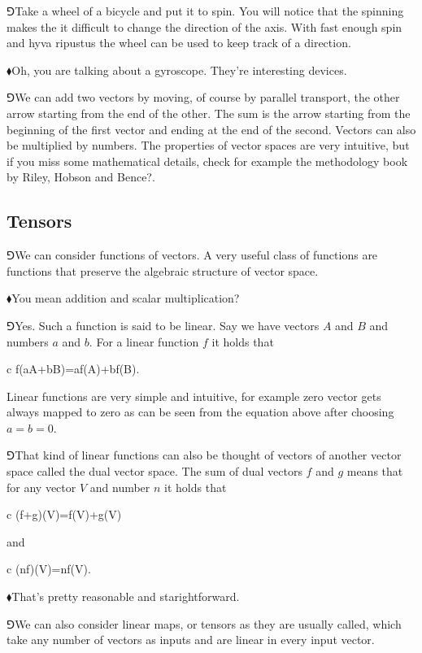 \documentclass[10pt,oneside%
]{memoir}
\newenvironment{eqna}{\begin{IEEEeqnarray*}{c}}{\end{IEEEeqnarray*}\ignorespacesafterend}
\newcommand{\hea}{\(\blacklozenge\)\;}
\newcommand{\heb}{\(\Game\)\;}
\begin{document}
\heb Take a wheel of a bicycle and put it to spin. You will notice that the spinning makes the it difficult to change the direction of the axis. With fast enough spin and hyva ripustus the wheel can be used to keep track of a direction.

\hea Oh, you are talking about a gyroscope. They're interesting devices.

\heb We can add two vectors by moving, of course by parallel transport, the other arrow starting from the end of the other. The sum is the arrow starting from the beginning of the first vector and ending at the end of the second. Vectors can also be multiplied by numbers. The properties of vector spaces are very intuitive, but if you miss some mathematical details, check for example the methodology book by Riley, Hobson and Bence?.
\subsection{Tensors}
\heb We can consider functions of vectors. A very useful class of functions are functions that preserve the algebraic structure of vector space.

\hea You mean addition and scalar multiplication? 

\heb Yes. Such a function is said to be linear. Say we have vectors \(A\) and \(B\) and numbers \(a\) and \(b\). For a linear function \(f\) it holds that
\begin{eqna}
    f(aA+bB)=af(A)+bf(B).
\end{eqna}
Linear functions are very simple and intuitive, for example zero vector gets always mapped to zero as can be seen from the equation above after choosing \(a=b=0\).

\heb That kind of linear functions can also be thought of vectors of another vector space called the dual vector space. The sum of dual vectors \(f\) and \(g\) means that for any vector \(V\) and number \(n\) it holds that
\begin{eqna}
    (f+g)(V)=f(V)+g(V)
\end{eqna}
and
\begin{eqna}
    (nf)(V)=nf(V).
\end{eqna}

\hea That's pretty reasonable and starightforward.

\heb We can also consider linear maps, or tensors as they are usually called, which take any number of vectors as inputs and are linear in every input vector.
\end{document}
